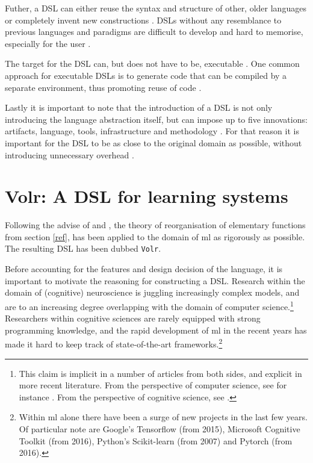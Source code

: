 \documentclass[a4paper,oneside]{memoir}
\begin{document}
Futher, a DSL can either reuse the syntax and structure of other, older
languages or completely invent new constructions
\autocite{Mernik2005, Deursen2002}. DSLs without any resemblance to previous
languages and paradigms are difficult to develop and hard to memorise,
especially for the user \autocite{Wile2004}.

The target for the DSL can, but does not have to be, executable
\autocite{Mernik2005}. One common approach for executable DSLs
is to generate code that can be compiled by a separate environment, thus
promoting reuse of code \autocite{Wile2004}.

Lastly it is important to note that the introduction of a DSL is not only
introducing the language abstraction itself, but can impose up to five
innovations: artifacts, language, tools, infrastructure and methodology
\autocite{Wile2004}. For that reason it is important for the DSL to be as
close to the original domain as possible, without introducing unnecessary
overhead \autocite{Wile2004, Mernik2005}.

{\let\clearpage\relax\chapter{Volr: A DSL for learning systems}}
\label{volr}

Following the advise of \cite{Mernik2005} and \cite{Wile2004}, the theory of
reorganisation of elementary functions from section \ref{ref}, has been
applied to the domain of \gls{ml} as rigorously as possible.
The resulting DSL has been dubbed \texttt{Volr}.

Before accounting for the features and design decision of the language, it is
important to motivate the reasoning for constructing a DSL.
Research within the domain of (cognitive) neuroscience is juggling increasingly
complex models, and are to an increasing degree overlapping with the domain of
computer science.\footnote{This claim is implicit in a number of articles from both
sides, and explicit in more recent literature. From the perspective of computer
science, see for instance \autocite{Nilsson2009, walter2015, schmidhuber2014,
russel2007}. From the perspective of cognitive science, see \autocite{Hohwy2009,
dennett2017, dayan2001, sep:cognitive-science}.} Researchers within cognitive
sciences are rarely equipped with strong programming knowledge, and the rapid
development of \gls{ml} in the recent years has made it hard to keep track of
state-of-the-art frameworks.\footnote{Within \gls{ml} alone there have been
a surge of new projects in the last few years. Of particular note are
Google's Tensorflow (from 2015), Microsoft Cognitive Toolkit (from 2016),
Python's Scikit-learn (from 2007) and Pytorch (from 2016).}
\end{document}
